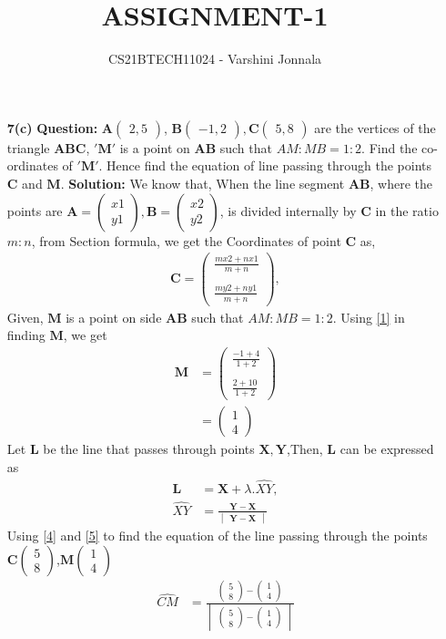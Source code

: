 \documentclass[journal,12pt,twocolumn]{IEEEtran}
\title{ASSIGNMENT-1}
\author{CS21BTECH11024 - Varshini  Jonnala}
\let\vec\mathbf
\newcommand{\question}{\noindent \textbf{Question: }}
\newcommand{\solution}{\noindent \textbf{Solution: }}
\newcommand{\mydet}[1]{\ensuremath{\begin{vmatrix}#1\end{vmatrix}}}
\newcommand{\myvec}[1]{\ensuremath{\begin{pmatrix}#1\end{pmatrix}}}
\begin{document}
\maketitle
\begin{enumerate}
\item[\textbf{7(c)}]\question $\vec{A}\myvec{2,5}$, $\vec{B}\myvec{-1,2}, \vec{C}\myvec{5,8}$ are the vertices of the triangle $\vec{ABC}$, $\vec{'M'}$ is a point on $\vec{AB}$ such that $AM:MB = 1:2$. Find the co-ordinates of $\vec{'M'}$. Hence find the equation of line passing through the points $\vec{C}$ and $\vec{M}$.
\newline \newline
\solution 
We know that, When the line segment $\vec{AB}$, where the points are $\vec{A}=\myvec{x1\\y1}, \vec{B}=\myvec{x2\\y2}$, is divided internally by $\vec{C}$ in the ratio $m:n$, from Section formula,
 we get the Coordinates of point $\vec{C}$ as,
\begin{align} 
\vec{C} = \myvec{\frac{mx2+nx1}{m+n}\\\\ \frac{my2+ny1}{m+n}},\label{1}
\end{align}
Given, $\vec{M}$ is a point on side $\vec{AB}$ such that $AM:MB = 1:2$. 
Using \eqref{1} in finding $\vec{M}$, we get
\begin{align}
    \vec{M} &= \myvec{\frac{-1+4}{1+2}\\\\ \frac{2+10}{1+2}}\\  \label{3}
   &= \myvec{1\\4}
\end{align}\newline
Let $\vec{L}$ be the line that passes through points $\vec{X,Y}$,Then, $\vec{L}$ can be expressed as
\begin{align}
\label{4}
     \vec{L} &= \vec{X} + \lambda.\hat{XY} ,\\
\hat{XY} &= \frac{\vec{Y} - \vec{X}}{\mydet{\vec{Y} - \vec{X}}} \label{5}
\end{align}
Using \eqref{4} and \eqref{5} to find the equation of the line passing through the points $\vec{C}\myvec{5\\8}$,$\vec{M}\myvec{1\\4}$
\begin{align}
  \hat{CM} &= \frac{\myvec{5\\8} - \myvec{1\\4}}{\mydet{\myvec{5\\8} - \myvec{1\\4}}}\\

\end{align}
\end{enumerate}
\end{document}
